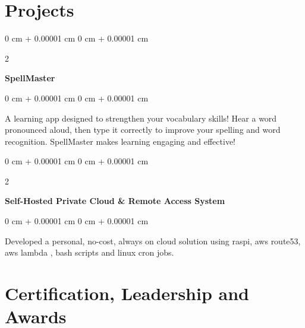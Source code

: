 \documentclass[10pt, a4paper]{article}
\newenvironment{highlights}{
    \begin{itemize}[
        topsep=0.10 cm,
        parsep=0.10 cm,
        partopsep=0pt,
        itemsep=0pt,
        leftmargin=0 cm + 10pt
    ]
}{
    \end{itemize}
} %
\newenvironment{onecolentry}{
    \begin{adjustwidth}{
        0 cm + 0.00001 cm
    }{
        0 cm + 0.00001 cm
    }
}{
    \end{adjustwidth}
} %
\newenvironment{twocolentry}[2][]{
    \onecolentry
    \def\secondColumn{#2}
    \setcolumnwidth{\fill, 4.5 cm}
    \begin{paracol}{2}
}{
    \switchcolumn \raggedleft \secondColumn
    \end{paracol}
    \endonecolentry
} %
\begin{document}
    \section{Projects}
        \begin{twocolentry}{
        }
            \textbf{SpellMaster}\end{twocolentry}

        \vspace{0.10 cm}
        \begin{onecolentry}
            \begin{highlights}
                A learning app designed to strengthen your vocabulary skills! Hear a word pronounced aloud, then type it correctly to improve your spelling and word recognition.
SpellMaster makes learning engaging and effective!
            \end{highlights}
        \end{onecolentry}


        \vspace{0.2 cm}

        \begin{twocolentry}{
        }
            \textbf{Self-Hosted Private Cloud \& Remote Access System}
            \end{twocolentry}

        \vspace{0.10 cm}
        \begin{onecolentry}
            \begin{highlights}
                Developed a personal, no-cost, always on cloud solution using raspi, aws route53, aws lambda , bash scripts and linux cron jobs.
     
            \end{highlights}
        \end{onecolentry}

    
    \section{Certification, Leadership and Awards}
\end{document}
